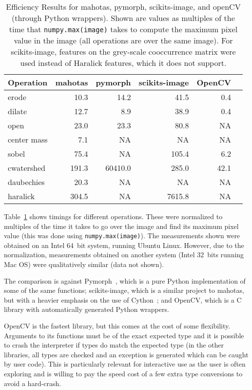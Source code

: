 \documentclass{article}
\newcommand*{\cpp}{{C\nolinebreak[4]\hspace{-.05em}\raisebox{.4ex}{\tiny\textbf{++}}}}
\let\code\texttt
\begin{document}
\begin{table}
\centering
\begin{tabular}{lrrrrr}
\toprule
Operation & mahotas & pymorph & scikits-image & OpenCV\\
\midrule
erode       &     10.3 &     14.2 &     41.5 &      0.4 & \\
dilate      &     12.7 &      8.9 &     38.9 &      0.4 & \\
open        &     23.0 &     23.3 &     80.8 &       NA & \\
center mass &      7.1 &       NA &       NA &       NA & \\
sobel       &     75.4 &       NA &    105.4 &      6.2 & \\
cwatershed  &    191.3 &  60410.0 &    285.0 &     42.1 & \\
daubechies  &     20.3 &       NA &       NA &       NA & \\
haralick    &    304.5 &       NA &   7615.8 &       NA & \\
\bottomrule
\end{tabular}
\caption{Efficiency Results for mahotas, pymorph, scikits-image, and openCV
(through Python wrappers). Shown are values as multiples of the time that
\code{numpy.max(image)} takes to compute the maximum pixel value in the image
(all operations are over the same image). For scikits-image, features on the
grey-scale cooccurrence matrix were used instead of Haralick features, which it
does not support.}
\label{tab:efficiency}
\end{table}

Table~\ref{tab:efficiency} shows timings for different operations. These were
normalized to multiples of the time it takes to go over the image and find its
maximum pixel value (this was done using \code{numpy.max(image)}). The
measurements shown were obtained on an Intel 64~bit system, running Ubuntu
Linux. However, due to the normalization, measurements obtained on another
system (Intel 32~bits running Mac OS) were qualitatively similar (data not
shown).

The comparison is against Pymorph~\citep{DougLotu:03}, which is a pure Python
implementation of some of the same functions; scikits-image, which is a similar
project to mahotas, but with a heavier emphasis on the use of
Cython~\citep{Cython}; and OpenCV, which is a \cpp{} library with automatically
generated Python wrappers.

OpenCV is the fastest library, but this comes at the cost of some flexibility.
Arguments to its functions must be of the exact expected type and it is
possible to crash the interpreter if types do match the expected type (in the
other libraries, all types are checked and an exception is generated which can
be caught by user code). This is particularly relevant for interactive use as
the user is often exploring and is willing to pay the speed cost of a few extra
type conversions to avoid a hard-crash.
\end{document}
